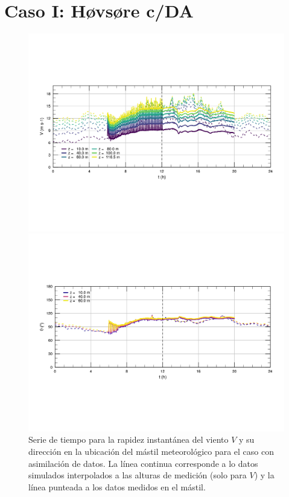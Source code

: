\section{Caso I: Høvsøre c/DA}

\begin{figure}[H]
	\centering
	\includegraphics[width=1\linewidth,trim={9mm 63mm 10mm 55mm},clip]{Imagenes/06/hov_da/ts_v}%
	
	\includegraphics[width=1\linewidth,trim={12mm 55mm 10mm 55mm},clip]{Imagenes/06/hov_da/ts_o}%
	\caption{Serie de tiempo para la rapidez instantánea del viento $V$ y su dirección en la ubicación del mástil meteorológico para el caso con asimilación de datos. La línea continua corresponde a lo datos simulados interpolados a las alturas de medición (solo para $V$) y la línea punteada a los datos medidos en el mástil.}
	\label{fig:06_hov_da_ts}
\end{figure}



